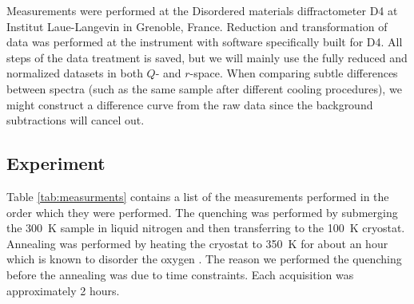 \noindent Measurements were performed at the Disordered materials diffractometer D4 at Institut Laue-Langevin in Grenoble, France. Reduction and transformation of data was performed at the instrument with software specifically built for D4. All steps of the data treatment is saved, but we will mainly use the fully reduced and normalized datasets in both $Q$- and $r$-space. When comparing subtle differences between spectra (such as the same sample after different cooling procedures), we might construct a difference curve from the raw data since the background subtractions will cancel out.

\subsection{Experiment}
Table \ref{tab:measurments} contains a list of the measurements performed in the order which they were performed. The quenching was performed by submerging the \SI{300}{\kelvin} sample in liquid nitrogen and then transferring to the \SI{100}{\kelvin} cryostat. Annealing was performed by heating the cryostat to \SI{350}{\kelvin} for about an hour which is known to disorder the oxygen \cite{Poccia2012}. The reason we performed the quenching before the annealing was due to time constraints. Each acquisition was approximately 2 hours.

